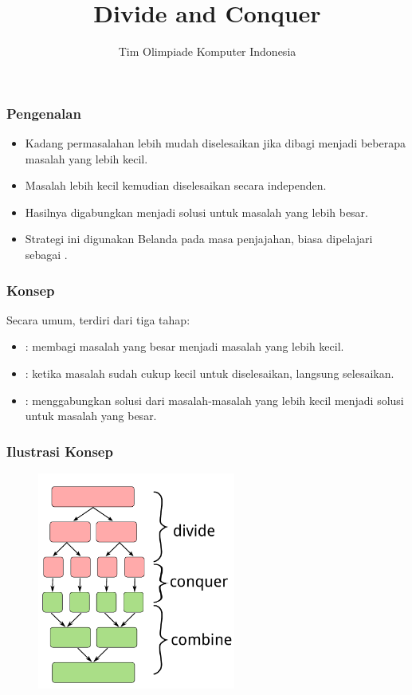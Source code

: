

\title{Divide and Conquer}
\author{Tim Olimpiade Komputer Indonesia}
\date{}



\begin{frame}
\titlepage
\end{frame}

\begin{frame}
\frametitle{Pengenalan}
\begin{itemize}
  \item Kadang permasalahan lebih mudah diselesaikan jika dibagi menjadi beberapa masalah yang lebih kecil.
  \item Masalah lebih kecil kemudian diselesaikan secara independen.
  \item Hasilnya digabungkan menjadi solusi untuk masalah yang lebih besar.
  \item Strategi ini digunakan Belanda pada masa penjajahan, biasa dipelajari sebagai .
\end{itemize}
\end{frame}

\begin{frame}
\frametitle{Konsep}
Secara umum,  terdiri dari tiga tahap:
\begin{itemize}
  \item {}: membagi masalah yang besar menjadi masalah yang lebih kecil.
  \item {}: ketika masalah sudah cukup kecil untuk diselesaikan, langsung selesaikan.
  \item {}: menggabungkan solusi dari masalah-masalah yang lebih kecil menjadi solusi untuk masalah yang besar.
\end{itemize}
\end{frame}

\begin{frame}
\frametitle{Ilustrasi Konsep}
\begin{figure}
  \includegraphics[width=6.5cm]{asset/dnc-concept.pdf}
\end{figure}
\end{frame}

